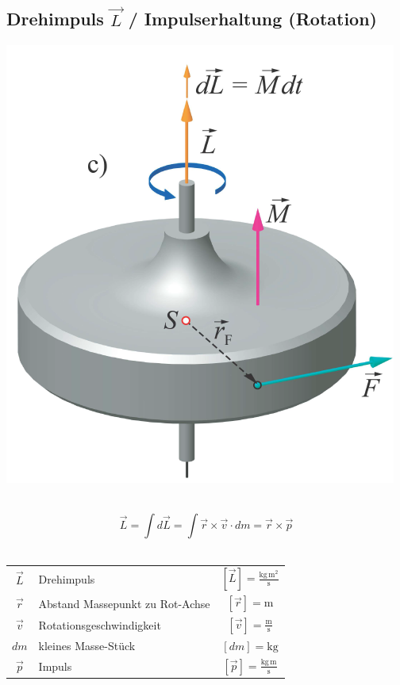 	\subsection{Drehimpuls $\vec{L}$ / Impulserhaltung (Rotation)}
		\begin{minipage}{0.42\linewidth}
			\includegraphics[width=\linewidth]{Bilder/drehimpuls} \\
			\\
		\end{minipage}
		\hfill
		\begin{minipage}{0.56\linewidth}
			$$ \boxed{ \vec{L} = \int d \vec{L} = \int \vec{r} \times \vec{v} \cdot dm = \vec{r} \times \vec{p} }$$ \\
		\end{minipage}

		\begin{tabular}{c l c}
			$\vec{L}$ & Drehimpuls & $[\vec{L}] = \mathrm{\frac{kg \, m^2}{s}}$ \\
			$\vec{r}$ & Abstand Massepunkt zu Rot-Achse & $[\vec{r}] = \mathrm{m}$ \\
			$\vec{v}$ & Rotationsgeschwindigkeit & $[\vec{v}] = \mathrm{\frac{m}{s}}$ \\
			$dm$ & kleines Masse-Stück & $[dm] = \mathrm{kg}$ \\
			$\vec{p}$ & Impuls & $[\vec{p}] = \mathrm{\frac{kg \, m}{s}}$ \\
		\end{tabular}


